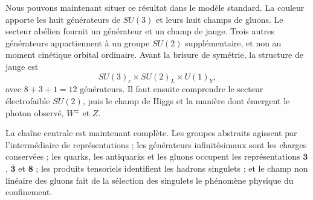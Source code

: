 Nous pouvons maintenant situer ce résultat dans le modèle standard. La couleur apporte les huit générateurs de \(SU(3)\) et leurs huit champs de gluons. Le secteur abélien fournit un générateur et un champ de jauge. Trois autres générateurs appartiennent à un groupe \(SU(2)\) supplémentaire, et non au moment cinétique orbital ordinaire. Avant la brisure de symétrie, la structure de jauge est
\begin{equation}
SU(3)_c\times SU(2)_L\times U(1)_Y,
\end{equation}
avec \(8+3+1=12\) générateurs. Il faut ensuite comprendre le secteur électrofaible \(SU(2)\), puis le champ de Higgs et la manière dont émergent le photon observé, \(W^\pm\) et \(Z\).

La chaîne centrale est maintenant complète. Les groupes abstraits agissent par l’intermédiaire de représentations ; les générateurs infinitésimaux sont les charges conservées ; les quarks, les antiquarks et les gluons occupent les représentations \(\boldsymbol 3\),
\(\bar{\boldsymbol 3}\) et \(\boldsymbol 8\) ; les produits tensoriels identifient les hadrons singulets ; et le champ non linéaire des gluons fait de la sélection des singulets le phénomène physique du confinement.
